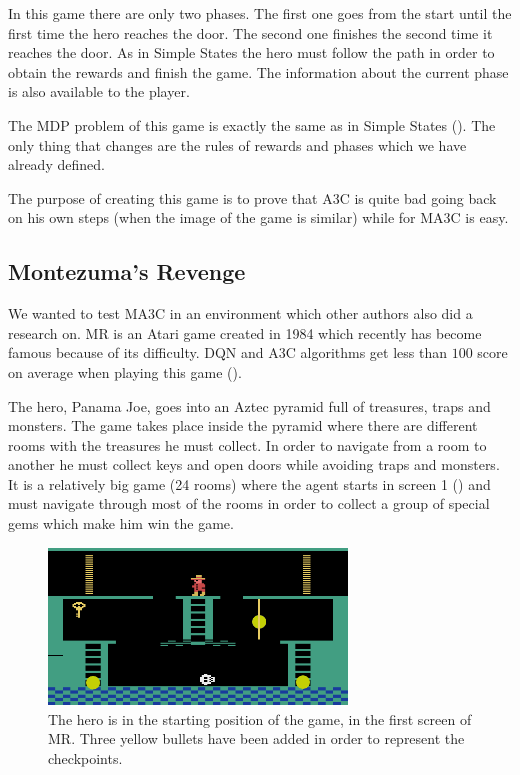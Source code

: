 In this game there are only two phases.
The first one goes from the start until the first time the hero reaches the door.
The second one finishes the second time it reaches the door.
As in Simple States the hero must follow the path in order to obtain the rewards and finish the game.
The information about the current phase is also available to the player.

The \ac{MDP} problem of this game is exactly the same as in Simple States ().
The only thing that changes are the rules of rewards and phases which we have already defined.

The purpose of creating this game is to prove that \ac{A3C} is quite bad going back on his own steps (when the image of the
game is similar) while for \ac{MA3C} is easy.

\subsection{Montezuma's Revenge\label{subsec:MontezumasRevenge}}

We wanted to test \ac{MA3C} in an environment which other authors also did a research on.
\acf{MR} is an Atari game created in 1984 which recently has become famous because of its difficulty.
\ac{DQN} and \ac{A3C} algorithms get less than $100$ score on average when playing this game (\cite{mnih2016A3C}).

The hero, Panama Joe, goes into an Aztec pyramid full of treasures, traps and monsters.
The game takes place inside the pyramid where there are different rooms with the treasures he must collect.
In order to navigate from a room to another he must collect keys and open doors while avoiding traps and monsters.
It is a relatively big game (24 rooms) where the agent starts in screen 1 () and must navigate
through most of the rooms in order to collect a group of special gems which make him win the game.

\begin{figure}[hbtp]
\begin{center}
\includegraphics[width=300]{img/montezuma_checkpoints.png}
\end{center}
\caption[Montezuma's Revenge game]
{The hero is in the starting position of the game, in the first screen of \acl{MR}.
Three yellow bullets have been added in order to represent the checkpoints.}
\label{fig:MontezumasRevenge}
\end{figure}

